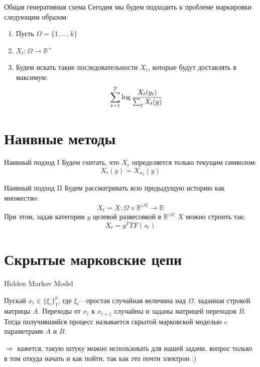 \documentclass[14pt, fleqn, xcolor={dvipsnames, table}]{beamer}
\begin{document}
\begin{frame}{Общая генеративная схема}
Сегодня мы будем подходить к проблеме маркировки следующим образом:
\begin{enumerate}
  \item Пусть $\Omega = \{1,\ldots,k\}$
  \item $X_t: \Omega \to \mathbb{R}^+$
  \item Будем искать такие последовательности $X_t$, которые будут доставлять в максимум:
  $$
    \sum_{t=1}^{T} \log {X_t(y_t) \over \sum_y X_t(y)}
  $$
\end{enumerate}
\end{frame}

\section{Наивные методы}

\begin{frame}{Наивный подход I}{}
Будем считать, что $X_t$ определяется только текущим символом:
$$
X_t(y) = X_{w_t}(y)
$$

\end{frame}

\begin{frame}{Наивный подход II}{}
Будем рассматривать всю предыдущую историю как множество:
$$X_t = X: \Omega \times \mathbb{R}^{|\mathcal{A}|} \to \mathbb{R}$$
При этом, задав категории $y$ целевой развесовкой в $\mathbb{R}^{|\mathcal{A}|}$ $X$ можно строить так:
$$X_t = y^T TF(s_t)$$
\end{frame}

\section{Скрытые марковские цепи}

\begin{frame}{Hidden Markov Model}
\begin{definition}[HMM]
Пускай $x_t \in \{\xi_i\}_1^p$, где $\xi_i$---простая случайная величина над $\Omega$, заданная строкой матрицы $A$.
Переходы от $x_t$ к $x_{t+1}$ случайны и заданы матрицей переходов $B$. Тогда получившийся процесс называется скрытой марковской моделью c параметрами $A$ и $B$.
\end{definition}
$\Rightarrow$ кажется, такую штуку можно использовать для нашей задачи, вопрос только в том откуда начать и как пойти, так как это почти электрон :)
\end{frame}
\end{document}
